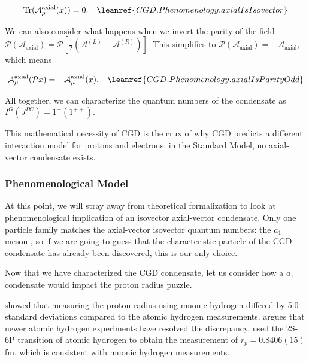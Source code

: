 \begin{equation}
    \mathrm{Tr}(\mathcal{A}^{\mathrm{axial}}_\mu(x)) = 0 .
    \quad \leanref{CGD.Phenomenology.axialIsIsovector}
    \label{eq:axialIsIsovector}
\end{equation}

\noindent We can also consider what happens when we invert the parity of the field $\mathcal{P}(\mathcal{A}_{\text{axial}}) = \mathcal{P}\left[ \frac{1}{2}(\mathcal{A}^{(L)} - \mathcal{A}^{(R)}) \right]$. This simplifies to $\mathcal{P}(\mathcal{A}_{\text{axial}}) = - \mathcal{A}_{\text{axial}}$, which means

\begin{equation}
    \mathcal{A}^{\mathrm{axial}}_\mu(\mathcal{P}x) = - \mathcal{A}^{\mathrm{axial}}_\mu(x).
    \quad \leanref{CGD.Phenomenology.axialIsParityOdd}
    \label{eq:axialIsParityOdd}
\end{equation}

\noindent All together, we can characterize the quantum numbers of the condensate as $I^G(J^{PC}) = 1^{-}(1^{++})$.

This mathematical necessity of CGD is the crux of why CGD predicts a different interaction model for protons and electrons: in the Standard Model, no axial-vector condensate exists.

\subsubsection{Phenomenological Model}

At this point, we will stray away from theoretical formalization to look at phenomenological implication of an isovector axial-vector condensate. Only one particle family matches the axial-vector isovector quantum numbers: the $a_1$ meson \citep{pdg2024}, so if we are going to guess that the characteristic particle of the CGD condensate has already been discovered, this is our only choice.

Now that we have characterized the CGD condensate, let us consider how a $a_1$ condensate would impact the proton radius puzzle.

\citet{pohl2010size} showed that measuring the proton radius using muonic hydrogen differed by 5.0 standard deviations compared to the atomic hydrogen measurements. \citet{miller2026proton} argues that newer atomic hydrogen experiments have resolved the discrepancy. \citet{maisenbacher2026sub} used the 2S-6P transition of atomic hydrogen to obtain the measurement of $r_p = 0.8406(15)$ fm, which is consistent with muonic hydrogen measurements.

